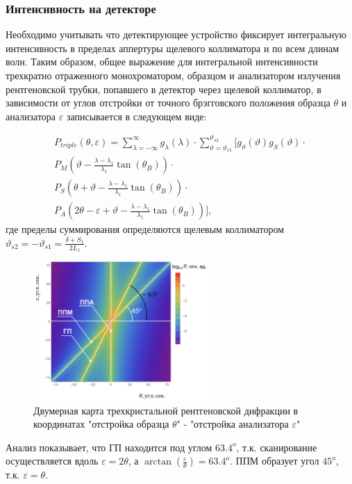 \subsubsection*{Интенсивность на детекторе}

Необходимо учитывать что детектирующее устройство фиксирует интегральную интенсивность в пределах аппертуры
щелевого коллиматора и по всем длинам волн.
Таким образом, общее выражение для интегральной интенсивности трехкратно отраженного
монохроматором, образцом и анализатором излучения рентгеновской трубки, попавшего в детектор через
щелевой коллиматор, в зависимости от углов отстройки от точного брэгговского положения образца $\theta$ и
анализатора $\varepsilon$ записывается в следующем виде:

\begin{eqnarray} \label{eq:doudle_spectra_angle}
  P_{triple}(\theta,\varepsilon) = \sum_{\lambda = -\infty}^{\infty}g_{\lambda}(\lambda)\cdot
  \sum_{\vartheta = \vartheta_{s1}}^{\vartheta_{s2}} \Bigg[ g_{\vartheta}(\vartheta) g_{S}(\vartheta) \cdot \nonumber \\
    P_M \left(\vartheta - \frac{\lambda - \lambda_1}{\lambda_1}\tan(\theta_B) \right) \cdot \nonumber \\
   P_S \left(\theta + \vartheta - \frac{\lambda - \lambda_1}{\lambda_1}\tan(\theta_B)\right)  \cdot  \nonumber \\
   P_A \left(2\theta - \varepsilon + \vartheta - \frac{\lambda - \lambda_1}{\lambda_1}\tan(\theta_B)\right) \Bigg],
 \end{eqnarray}
 \noindent
где пределы суммирования определяются щелевым коллиматором $\vartheta_{s2} = - \vartheta_{s1} = \frac{\delta+S_1}{2L_1}$.
 \begin{figure}[H]
   \centering
   \includegraphics[width=0.6\textwidth]{images/triple_map_direct_space.png}
   \caption{Двумерная карта трехкристальной рентгеновской дифракции
   в координатах "отстройка образца $\theta$" -  "отстройка анализатора $\varepsilon$"}
   \label{ris:triple_map_direct_space}
 \end{figure}

Анализ показывает, что ГП находится под углом $63.4^o$, т.к. сканирование осуществляется вдоль $\varepsilon = 2 \theta$,
а $ \arctan \left(\frac{\varepsilon}{\theta} \right) = 63.4^o$. ППМ образует угол $45^o$, т.к. $\varepsilon = \theta$.
